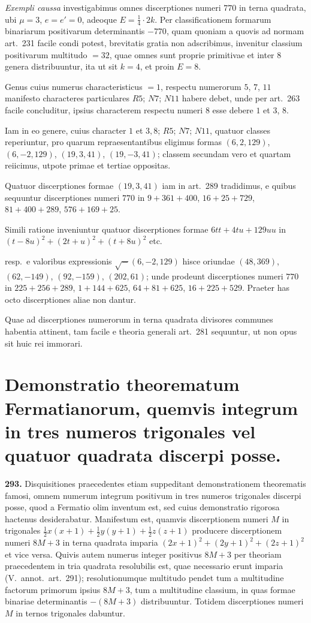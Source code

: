 \documentclass[12pt,a4paper]{article}
\theoremstyle{plain}
\theoremstyle{definition}
\theoremstyle{remark}
\begin{document}
\textit{Exempli caussa} investigabimus omnes discerptiones numeri $770$ in terna quadrata, ubi $\mu = 3$, $e = e' = 0$, adeoque $E = \tfrac{1}{4} \cdot 2k$. Per classificationem formarum binariarum positivarum determinantis $-770$, quam quoniam a quovis ad normam art.~231 facile condi potest, brevitatis gratia non adscribimus, invenitur classium positivarum multitudo $= 32$, quae omnes sunt proprie primitivae et inter 8 genera distribuuntur, ita ut sit $k = 4$, et proin $E = 8$.

Genus cuius numerus characteristicus $= 1$, respectu numerorum $5$, $7$, $11$ manifesto characteres particulares $R5$; $N7$; $N11$ habere debet, unde per art.~263 facile concluditur, ipsius characterem respectu numeri $8$ esse debere $1$ et $3$, $8$.

Iam in eo genere, cuius character $1$ et $3,8$; $R5$; $N7$; $N11$, quatuor classes reperiuntur, pro quarum repraesentantibus eligimus formas $(6,2,129)$, $(6,-2,129)$, $(19,3,41)$, $(19,-3,41)$; classem secundam vero et quartam reiicimus, utpote primae et tertiae oppositas.

Quatuor discerptiones formae $(19,3,41)$ iam in art.~289 tradidimus, e quibus sequuntur discerptiones numeri $770$ in $9+361+400$, $16+25+729$, $81+400+289$, $576+169+25$.

Simili ratione inveniuntur quatuor discerptiones formae $6tt + 4tu + 129uu$ in $(t-8u)^2 + (2t+u)^2 + (t+8u)^2$ etc.

resp.~e valoribus expressionis $\surd{-}(6,-2,129)$ hisce oriundae $(48, 369)$, $(62, -149)$, $(92, -159)$, $(202,61)$; unde prodeunt discerptiones numeri $770$ in $225+256+289$, $1+144+625$, $64+81+625$, $16+225+529$. Praeter has octo discerptiones aliae non dantur.

Quae ad discerptiones numerorum in terna quadrata divisores communes habentia attinent, tam facile e theoria generali art.~281 sequuntur, ut non opus sit huic rei immorari.

\section*{Demonstratio theorematum Fermatianorum, quemvis integrum in tres numeros trigonales vel quatuor quadrata discerpi posse.}

\textbf{293.} Disquisitiones praecedentes etiam suppeditant demonstrationem theorematis famosi, omnem numerum integrum positivum in tres numeros trigonales discerpi posse, quod a Fermatio olim inventum est, sed cuius demonstratio rigorosa hactenus desiderabatur. Manifestum est, quamvis discerptionem numeri $M$ in trigonales $\tfrac{1}{2}x(x+1) + \tfrac{1}{2}y(y+1) + \tfrac{1}{2}z(z+1)$ producere discerptionem numeri $8M+3$ in terna quadrata imparia $(2x+1)^2 + (2y+1)^2 + (2z+1)^2$ et vice versa. Quivis autem numerus integer positivus $8M+3$ per theoriam praecedentem in tria quadrata resolubilis est, quae necessario erunt imparia (V.~annot.~art.~291); resolutionumque multitudo pendet tum a multitudine factorum primorum ipsius $8M+3$, tum a multitudine classium, in quas formae binariae determinantis $-(8M+3)$ distribuuntur. Totidem discerptiones numeri $M$ in ternos trigonales dabuntur.
\end{document}
